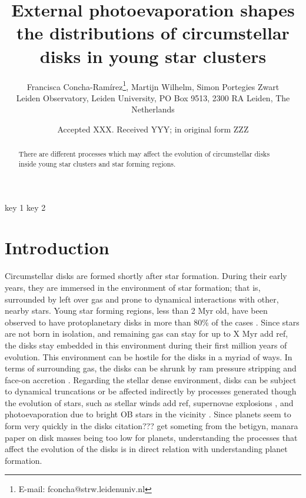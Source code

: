 \documentclass[fleqn,usenatbib]{mnras}
\title[External photoevaporation of disks in young star clusters]{External photoevaporation shapes the distributions of circumstellar disks in young star clusters}
\author[Concha-Ramírez et al.]{
Francisca Concha-Ramírez\thanks{E-mail: fconcha@strw.leidenuniv.nl},
Martijn Wilhelm,
Simon Portegies Zwart
\\
Leiden Observatory, Leiden University, PO Box 9513, 2300 RA Leiden, The Netherlands\\
}
\date{Accepted XXX. Received YYY; in original form ZZZ}
\newcommand\note[1]{{\colorbox{yellow!60}{\color{magenta}#1}}}
\begin{document}
\label{firstpage}
\pagerange{\pageref{firstpage}--\pageref{lastpage}}
\maketitle

\begin{abstract}
There are different processes which may affect the evolution of circumstellar disks inside young star clusters and star forming regions.
\end{abstract}

\begin{keywords}
key 1 key 2
\end{keywords}

\section{Introduction}
\label{sec:introduction}

Circumstellar disks are formed shortly after star formation. During their early years, they are immersed in the environment of star formation; that is, surrounded by left over gas and prone to dynamical interactions with other, nearby stars. Young star forming regions, less than 2 Myr old, have been observed to have protoplanetary disks in more than 80\% of the cases \citep{fedele2010}. Since stars are not born in isolation, and remaining gas can stay for up to X Myr \note{add ref}, the disks stay embedded in this environment during their first million years of evolution. This environment can be hostile for the disks in a myriad of ways. In terms of surrounding gas, the disks can be shrunk by ram pressure stripping and face-on accretion \citep{wijnen2016, wijnen2017}. Regarding the stellar dense environment, disks can be subject to dynamical truncations \citep{portegieszwart2016, vincke2015, vincke2016} or be affected indirectly by processes generated though the evolution of stars, such as stellar winds \note{add ref}, supernovae explosions \citep{close2017}, and photoevaporation due to bright OB stars in the vicinity \citep[e.g.][]{haworth2017, guarcello2016}. Since planets seem to form very quickly in the disks \note{citation??? get someting from the betigyn, manara paper on disk masses being too low for planets}, understanding the processes that affect the evolution of the disks is in direct relation with understanding planet formation.
\end{document}
